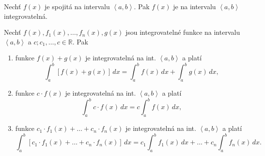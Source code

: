 \begin{veta}
Nechť $f(x)$ je spojitá na intervalu $\left < a,b \right > $. Pak $f(x)$ je na
intervalu $\left < a,b \right > $ integrovatelná.
\end{veta}

\begin{veta}
Nechť $f(x), f_1(x),\dots,f_n(x), g(x)$ jsou integrovatelné funkce na intervalu $\left < a,b \right > $
a $c; c_1,\dots,c\in \mathbb R.$ Pak
\begin{enumerate}[$i.$]
\item funkce $f(x)+g(x)$ je integrovatelná na int. $\left < a,b \right > $ a platí
$$\int _a^b \left [ f(x)+g(x) \right ] \, dx = \int_a ^b f(x)\, dx + \int_a ^b g(x) \, dx,$$
\item funkce $c\cdot f(x)$ je integrovatelná na int. $\left < a,b \right > $ a platí
$$\int _a ^b c\cdot f(x) \, dx = c \int _a ^b f(x)\, dx,$$
\item funkce $c_1\cdot f_1(x) + \dots + c_n \cdot f_n(x)$ je integrovatelná na int. $\left < a,b \right > $ a platí
$$\int_a ^b \left [ c_1\cdot f_1(x) + \dots + c_n \cdot f_n (x) \right ]\, dx = c_1 \int _a ^b f_1(x)\, dx + \dots + c_n \int _a ^b f_n(x)\, dx. $$
\end{enumerate}
\end{veta}
